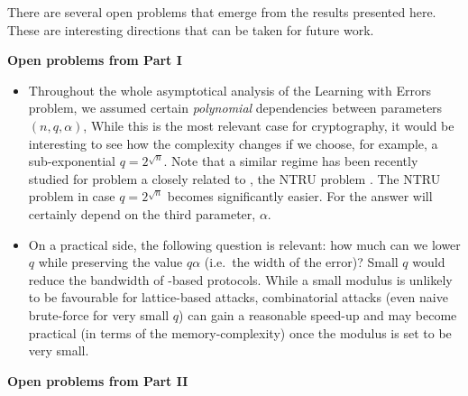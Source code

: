 There are several open problems that emerge from the results presented here. These are interesting directions that can be taken for future work.
\begin{center}
	\textbf{Open problems from Part I}
\end{center} 

\begin{itemize}
	\item Throughout the whole asymptotical analysis of the Learning with Errors problem, we assumed certain \emph{polynomial} dependencies between parameters $(n, q, \alpha)$, While this is the most relevant case for cryptography, it would be interesting to see how the complexity changes if we choose, for example, a sub-exponential $q = 2^{\sqrt{n}}$. Note that a similar regime has been recently studied for problem a closely related to \LWE, the NTRU problem \cite{C:AlbBaiDuc16}.  The NTRU problem in case $q = 2^{\sqrt{n}}$ becomes significantly easier. For \LWE the answer will certainly depend on the third parameter, $\alpha$. %
	\item On a practical side, the following question is relevant: how much can we lower $q$ while preserving the value $q\alpha$ (i.e.\ the width of the \LWE error)? Small $q$ would reduce the bandwidth of \LWE-based protocols. While a small modulus is unlikely to be favourable for lattice-based attacks, combinatorial attacks (even naive brute-force for very small $q$) can gain a reasonable speed-up and may become practical (in terms of the memory-complexity) once the modulus is set to be very small.
\end{itemize}

	
	
\vspace{7pt}
\begin{center}
	\textbf{Open problems from Part II}
\end{center} 

